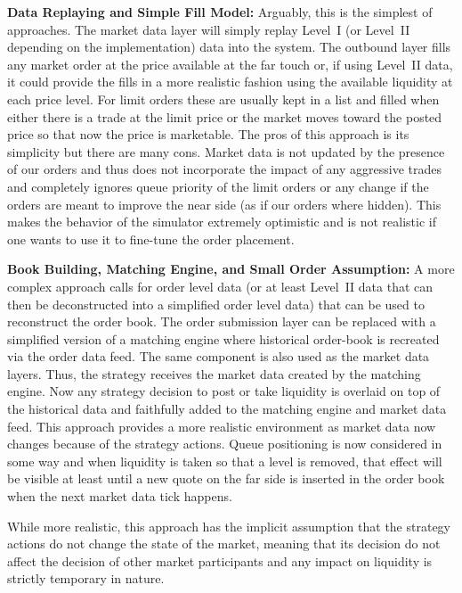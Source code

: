 \noindent\textbf{Data Replaying and Simple Fill Model:} Arguably, this is the simplest of approaches. The market data layer will simply replay Level~I (or Level~II depending on the implementation) data into the system. The outbound layer fills any market order at the price available at the far touch or, if using Level~II data, it could provide the fills in a more realistic fashion using the available liquidity at each price level. For limit orders these are usually kept in a list and filled when either there is a trade at the limit price or the market moves toward the posted price so that now the price is marketable. The pros of this approach is its simplicity but there are many cons. Market data is not updated by the presence of our orders and thus does not incorporate the impact of any aggressive trades and completely ignores queue priority of the limit orders or any change if the orders are meant to improve the near side (as if our orders where hidden). This makes the behavior of the simulator extremely optimistic and is not realistic if one wants to use it to fine-tune the order placement. \twomedskip


\noindent\textbf{Book Building, Matching Engine, and Small Order Assumption:} A more complex approach calls for order level data (or at least Level~II data that can then be deconstructed into a simplified order level data) that can be used to reconstruct the order book. The order submission layer can be replaced with a simplified version of a matching engine where historical order-book is recreated via the order data feed. The same component is also used as the market data layers. Thus, the strategy receives the market data created by the matching engine. Now any strategy decision to post or take liquidity is overlaid on top of the historical data and faithfully added to the matching engine and market data feed. This approach provides a more realistic environment as market data now changes because of the strategy actions. Queue positioning is now considered in some way and when liquidity is taken so that a level is removed, that effect will be visible at least until a new quote on the far side is inserted in the order book when the next market data tick happens.


While more realistic, this approach has the implicit assumption that the strategy actions do not change the state of the market, meaning that its decision do not affect the decision of other market participants and any impact on liquidity is strictly temporary in nature. 


